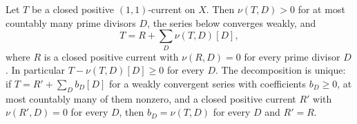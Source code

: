 \begin{theorem}\label{thm:siu-divisorial-decomposition}
Let $T$ be a closed positive $(1,1)$-current on $X$. Then $\nu(T,D)>0$ for at most countably many prime divisors $D$, the series below converges weakly, and
\begin{equation}\label{eq:siu-divisorial-decomposition}
 T=R+\sum_D\nu(T,D)[D],
\end{equation}
where $R$ is a closed positive current with $\nu(R,D)=0$ for every prime divisor $D$. In particular $T-\nu(T,D)[D]\geq0$ for every $D$. The decomposition is unique: if $T=R'+\sum_Db_D[D]$ for a weakly convergent series with coefficients $b_D\geq0$, at most countably many of them nonzero, and a closed positive current $R'$ with $\nu(R',D)=0$ for every $D$, then $b_D=\nu(T,D)$ for every $D$ and $R'=R$.
\end{theorem}
